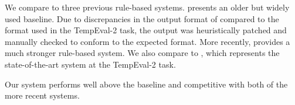 We compare to three previous rule-based systems.
 \cite{key:2000mani-temporal} presents an older but widely
	used baseline.
Due to discrepancies in the output format of  compared to the 
	format used in the TempEval-2 task, the output was heuristically patched
	and manually checked to conform to the expected format.
More recently, \needcite provides a much stronger rule-based
	system.
We also compare to  \cite{key:2010strotgen-temporal}, 
	which represents the state-of-the-art system at the TempEval-2 task.

Our system performs well above the  baseline and competitive
	with both of the more recent systems.



